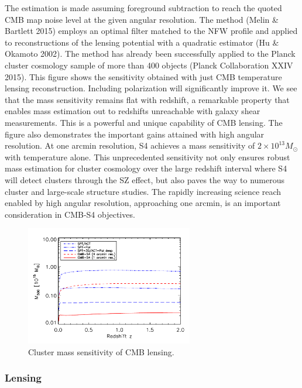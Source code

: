 	The estimation is made assuming foreground subtraction to reach the quoted CMB map noise level at the given angular resolution.  The method (Melin \& Bartlett 2015) employs an optimal filter matched to the NFW profile and applied to reconstructions of the lensing potential with a quadratic estimator (Hu \& Okamoto 2002).  The method has already been successfully applied to the Planck cluster cosmology sample of more than 400 objects (Planck Collaboration XXIV 2015).  This figure shows the sensitivity obtained with just CMB temperature lensing reconstruction.  Including polarization will significantly improve it.  
	We see that the mass sensitivity remains flat with redshift, a remarkable property that enables mass estimation out to redshifts unreachable with galaxy shear measurements.  This is a powerful and unique capability of CMB lensing.  The figure also demonstrates the important gains attained with high angular resolution.  At one arcmin resolution, S4 achieves a mass sensitivity of $2 \times 10^{13}M_\odot$ with temperature alone.  This unprecedented sensitivity not only ensures robust mass estimation for cluster cosmology over the large redshift interval where S4 will detect clusters through the SZ effect, but also paves the way to numerous cluster and large-scale structure studies.  The rapidly increasing science reach enabled by high angular resolution, approaching one arcmin, is an important consideration in CMB-S4 objectives.  

\begin{figure}[t!]
\begin{center}
\includegraphics[width=0.65\textwidth]{DarkEnergy/m500lim_vs_z_1sigma_cmbs4_v1.pdf}
\caption{Cluster mass sensitivity of CMB lensing.}
\label{fig:limits}
\end{center}
\end{figure} 

\subsubsection{Lensing}

